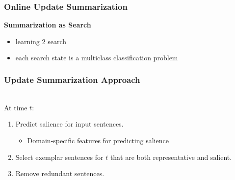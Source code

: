 \documentclass{beamer}
\begin{document}
\begin{frame}
    \frametitle{Online Update Summarization}
    \textbf{Summarization as Search}\\
    \begin{itemize}
        \item learning 2 search
        \item each search state is a multiclass classification problem 
    \end{itemize}
\end{frame}




\begin{frame}
\frametitle{Update Summarization Approach}
~\\
At time $t$:
\begin{enumerate}
\item Predict salience for input sentences. 
\pause
\begin{itemize}
\item Domain-specific features for predicting salience
\end{itemize}
\pause
\item Select exemplar sentences for $t$ that are both representative and
    salient.
\pause
\item Remove redundant sentences.
\end{enumerate}
\end{frame}
\end{document}

